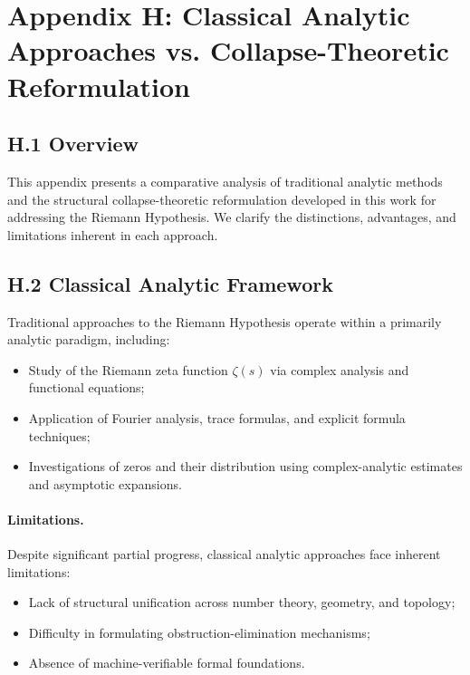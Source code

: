 \documentclass[11pt]{article}
\begin{document}
\section*{Appendix H: Classical Analytic Approaches vs. Collapse-Theoretic Reformulation}

\subsection*{H.1 Overview}

This appendix presents a comparative analysis of traditional analytic methods and the structural collapse-theoretic reformulation developed in this work for addressing the Riemann Hypothesis. We clarify the distinctions, advantages, and limitations inherent in each approach.

\subsection*{H.2 Classical Analytic Framework}

Traditional approaches to the Riemann Hypothesis operate within a primarily analytic paradigm, including:

\begin{itemize}
    \item Study of the Riemann zeta function $\zeta(s)$ via complex analysis and functional equations;
    \item Application of Fourier analysis, trace formulas, and explicit formula techniques;
    \item Investigations of zeros and their distribution using complex-analytic estimates and asymptotic expansions.
\end{itemize}

\paragraph{Limitations.}  
Despite significant partial progress, classical analytic approaches face inherent limitations:

\begin{itemize}
    \item Lack of structural unification across number theory, geometry, and topology;
    \item Difficulty in formulating obstruction-elimination mechanisms;
    \item Absence of machine-verifiable formal foundations.
\end{itemize}
\end{document}
